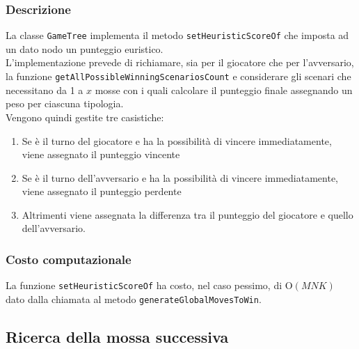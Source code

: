 \documentclass[11pt]{article}
\begin{document}
\subsubsection*{Descrizione}
La classe \texttt{GameTree} implementa il metodo \texttt{setHeuristicScoreOf} che imposta ad un dato nodo un punteggio euristico.\\
L'implementazione prevede di richiamare, sia per il giocatore che per l'avversario, la funzione \texttt{getAllPossibleWinningScenariosCount} e considerare gli scenari che necessitano da 1 a $x$ mosse con i quali calcolare il punteggio finale assegnando un peso per ciascuna tipologia.\\
Vengono quindi gestite tre casistiche:
\vspace{-0.2cm}
\begin{enumerate}
\setlength\itemsep{0.05cm}
	\item Se è il turno del giocatore e ha la possibilità di vincere immediatamente, viene assegnato il punteggio vincente
	\item Se è il turno dell'avversario e ha la possibilità di vincere immediatamente, viene assegnato il punteggio perdente
	\item Altrimenti viene assegnata la differenza tra il punteggio del giocatore e quello dell'avversario.
\end{enumerate}
\subsubsection*{Costo computazionale}
La funzione \texttt{setHeuristicScoreOf} ha costo, nel caso pessimo, di O$(MNK)$ dato dalla chiamata al metodo \texttt{generateGlobalMovesToWin}.

\subsection*{Ricerca della mossa successiva}
\end{document}
